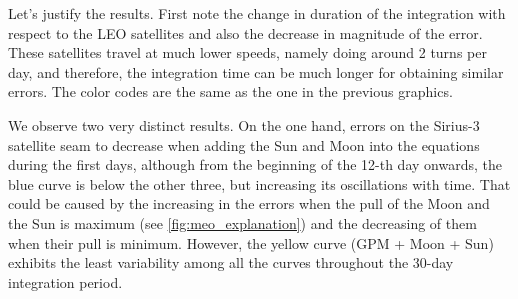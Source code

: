 \documentclass[../main.tex]{subfiles}
\begin{document}
Let's justify the results. First note the change in duration of the integration with respect to the LEO satellites and also the decrease in magnitude of the error. These satellites travel at much lower speeds, namely doing around 2 turns per day, and therefore, the integration time can be much longer for obtaining similar errors. The color codes are the same as the one in the previous graphics.

We observe two very distinct results. On the one hand, errors on the Sirius-3 satellite seam to decrease when adding the Sun and Moon into the equations during the first days, although from the beginning of the 12-th day onwards, the blue curve is below the other three, but increasing its oscillations with time. That could be caused by the increasing in the errors when the pull of the Moon and the Sun is maximum (see \cref{fig:meo_explanation}) and the decreasing of them when their pull is minimum. However, the yellow curve (GPM + Moon + Sun) exhibits the least variability among all the curves throughout the 30-day integration period.
\end{document}
